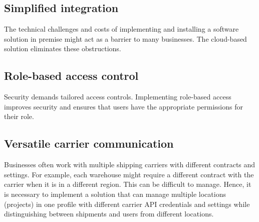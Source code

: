 \subsection{Simplified integration}
The technical challenges and costs of implementing and installing a software solution in premise might act as a barrier to many businesses. 
The cloud-based solution eliminates these obstructions.

\subsection{Role-based access control}
Security demands tailored access controls.
Implementing role-based access improves security and ensures that users have the appropriate permissions for their role.

\subsection{Versatile carrier communication}
Businesses often work with multiple shipping carriers with different contracts and settings. 
For example, each warehouse might require a different contract with the carrier when it is in a different region.
This can be difficult to manage. 
Hence, it is necessary to implement a solution that can manage multiple locations (projects) in one profile with different carrier API credentials and settings while distinguishing between shipments and users from different locations.



